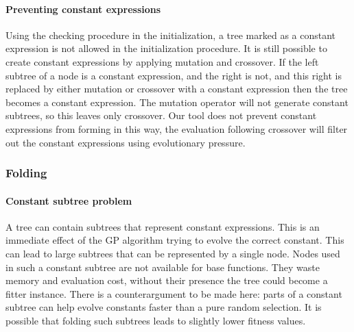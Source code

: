 \paragraph{Preventing constant expressions}
Using the checking procedure in the initialization, a tree marked as a constant expression is not allowed in the initialization procedure.
It is still possible to create constant expressions by applying mutation and crossover. If the left subtree of a node is a constant expression, and the right is not, and this right is replaced by either mutation or crossover with a constant expression then the tree becomes a constant expression. The mutation operator will not generate constant subtrees, so this leaves only crossover. Our tool does not prevent constant expressions from forming in this way, the evaluation following crossover will filter out the constant expressions using evolutionary pressure.

\subsubsection{Folding}\label{secconstfolding}

\paragraph{Constant subtree problem}
A tree can contain subtrees that represent constant expressions. This is an immediate effect of the GP algorithm trying to evolve the correct constant. This can lead to large subtrees that can be represented by a single node. Nodes used in such a constant subtree are not available for base functions. They waste memory and evaluation cost, without their presence the tree could become a fitter instance. 
There is a counterargument to be made here: parts of a constant subtree can help evolve constants faster than a pure random selection. It is possible that folding such subtrees leads to slightly lower fitness values.

